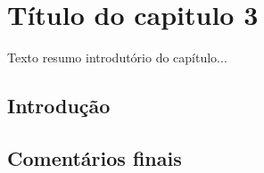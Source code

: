 \graphicspath{{figuras/}}

\chapter{Título do capitulo 3}
\label{cap3}

Texto resumo introdutório do capítulo...

\section{Introdução}


\section{Comentários finais}